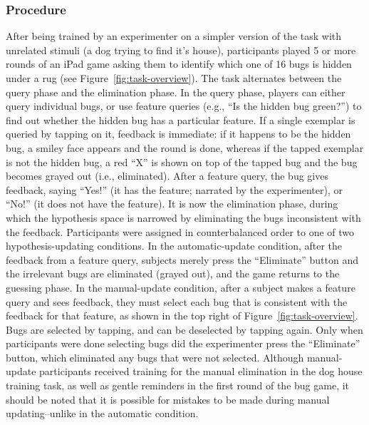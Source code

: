 \documentclass[10pt,letterpaper]{article}
\begin{document}
\subsubsection{Procedure}

After being trained by an experimenter on a simpler version of the task with unrelated stimuli (a dog trying to find it's house), participants played 5 or more rounds of an iPad game asking them to identify which one of 16 bugs is hidden under a rug (see Figure~\ref{fig:task-overview}). The task alternates between the query phase and the elimination phase. In the query phase, players can either query individual bugs, or use feature queries (e.g., ``Is the hidden bug green?'') to find out whether the hidden bug has a particular feature. If a single exemplar is queried by tapping on it, feedback is immediate: if it happens to be the hidden bug, a smiley face appears and the round is done, whereas if the tapped exemplar is not the hidden bug, a red ``X'' is shown on top of the tapped bug and the bug becomes grayed out (i.e., eliminated). After a feature query, the bug gives feedback, saying ``Yes!'' (it has the feature; narrated by the experimenter), or ``No!'' (it does not have the feature). It is now the elimination phase, during which the hypothesis space is narrowed by eliminating the bugs inconsistent with the feedback. Participants were assigned in counterbalanced order to one of two hypothesis-updating conditions. In the automatic-update condition, after the feedback from a feature query, subjects merely press the ``Eliminate'' button and the irrelevant bugs are eliminated (grayed out), and the game returns to the guessing phase. In the manual-update condition, after a subject makes a feature query and sees feedback, they must select each bug that is consistent with the feedback for that feature, as shown in the top right of Figure~\ref{fig:task-overview}. Bugs are selected by tapping, and can be deselected by tapping again. Only when participants were done selecting bugs did the experimenter press the ``Eliminate'' button, which eliminated any bugs that were not selected. Although manual-update participants received training for the manual elimination in the dog house training task, as well as gentle reminders in the first round of the bug game, it should be noted that it is possible for mistakes to be made during manual updating--unlike in the automatic condition.
\end{document}
